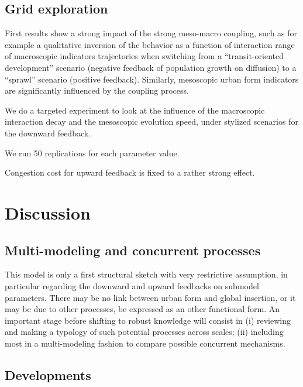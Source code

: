 \documentclass[11pt]{article}
\begin{document}
\subsection{Grid exploration}



First results show a strong impact of the strong meso-macro coupling, such as for example a qualitative inversion of the behavior as a function of interaction range of macroscopic indicators trajectories when switching from a ``transit-oriented development'' scenario (negative feedback of population growth on diffusion) to a ``sprawl'' scenario (positive feedback). Similarly, mesoscopic urban form indicators are significantly influenced by the coupling process.



We do a targeted experiment to look at the influence of the macroscopic interaction decay and the mesoscopic evolution speed, under stylized scenarios for the downward feedback.

We run 50 replications for each parameter value.

Congestion cost for upward feedback is fixed to a rather strong effect.





\section{Discussion}


\subsection{Multi-modeling and concurrent processes}

This model is only a first structural sketch with very restrictive assumption, in particular regarding the downward and upward feedbacks on submodel parameters. There may be no link between urban form and global insertion, or it may be due to other processes, be expressed as an other functional form. An important stage before shifting to robust knowledge will consist in (i) reviewing and making a typology of such potential processes across scales; (ii) including most in a multi-modeling fashion to compare possible concurrent mechanisms.


\subsection{Developments}
\end{document}

